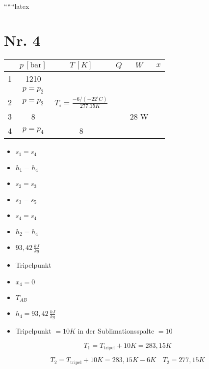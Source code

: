 
``````latex


\section*{Nr. 4}

\begin{tabular}{|c|c|c|c|c|c|}
\hline
 & $p \, [\text{bar}]$ & $T \, [K]$ & $Q$ & $W$ & $x$ \\
\hline
1 & 1210 & & & & \\
 & $p = p_2$ & & & & \\
\hline
2 & $p = p_2$ & $T_i = \frac{-6 / (-22^\circ C)}{277.15 K}$ & & & \\
\hline
3 & 8 & & & 28 W & \\
\hline
4 & $p = p_4$ & 8 & & & \\
\hline
\end{tabular}

\begin{itemize}
    \item $s_1 = s_4$
    \item $h_1 = h_4$
    \item $s_2 = s_3$
    \item $s_3 = s_5$
\end{itemize}

\begin{itemize}
    \item $s_4 = s_4$
    \item $h_2 = h_4$
    \item $93,42 \, \frac{kJ}{kg}$
\end{itemize}

\begin{itemize}
    \item Tripelpunkt
    \item $x_4 = 0$
\end{itemize}

\begin{itemize}
    \item $T_{AB}$
    \item $h_4 = 93,42 \, \frac{kJ}{kg}$
\end{itemize}

\begin{itemize}
    \item Tripelpunkt $= 10 K$ in der Sublimationsspalte $= 10$
\end{itemize}

\[
T_1 = T_{\text{tripel}} + 10 K = 283,15 K
\]

\[
T_2 = T_{\text{tripel}} + 10 K = 283,15 K - 6 K \quad T_2 = 277,15 K
\]

